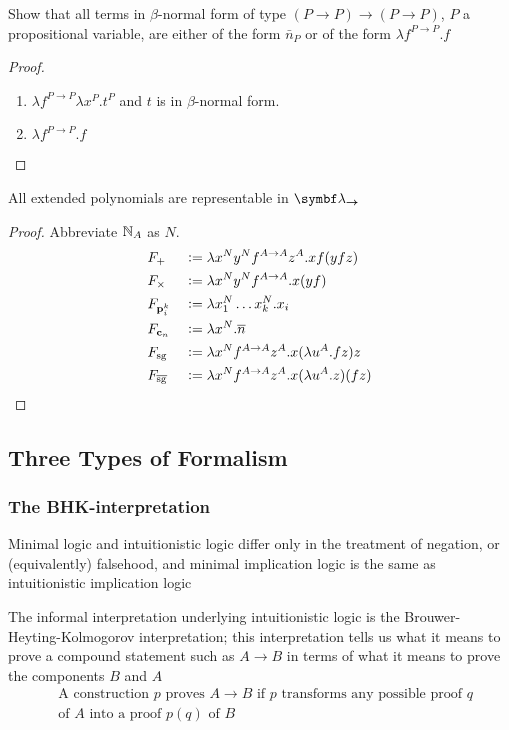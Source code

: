 \documentclass[11pt]{article}
\begin{document}
\begin{exercise}
Show that all terms in \(\beta\)-normal form of type \((P\to P)\to(P\to P)\), \(P\) a
propositional variable, are either of the form \(\bar{n}_P\) or of the form
\(\lambda f^{P\to P}.f\)
\end{exercise}
\begin{proof}
\begin{enumerate}
\item \(\lambda f^{P\to P}\lambda x^P.t^P\) and \(t\) is in \(\beta\)-normal form.
\item \(\lambda f^{P\to P}.f\)
\end{enumerate}
\end{proof}

\begin{theorem}[]
All extended polynomials are representable in \(\blambda_{\bto}\)
\end{theorem}
\begin{proof}
Abbreviate \(\mathbb{N}_A\) as \(N\).
\begin{alignat*}{2}
&F_+&&:=\lambda x^Ny^Nf^{A\to A}z^A.xf(yfz)\\
&F_\times&&:=\lambda x^Ny^Nf^{A\to A}.x(yf)\\
&F_{\operatorname{\textbf{p}}_i^k}&&:=\lambda x_1^N\dots x_k^N.x_i\\
&F_{\operatorname{\textbf{c}}_n}&&:=\lambda x^N.\overline{n}\\
&F_{\operatorname{sg}}&&:=\lambda x^Nf^{A\to A}z^A.x(\lambda u^A.fz)z\\
&F_{\overline{\operatorname{sg}}}&&:=\lambda x^Nf^{A\to A}z^A.x(\lambda u^A.z)(fz)
\end{alignat*}
\end{proof}

\subsection{Three Types of Formalism}
\label{sec:orga6a27a6}
\subsubsection{The BHK-interpretation}
\label{sec:org715bb22}
Minimal logic and intuitionistic logic differ only in the treatment of
negation, or (equivalently) falsehood, and minimal implication logic is the
same  
as intuitionistic implication logic

The informal interpretation underlying intuitionistic logic is the
Brouwer-Heyting-Kolmogorov interpretation; this interpretation tells us what
it means to 
prove a compound statement such as \(A\to B\) in terms of what it means to
prove the components \(B\) and \(A\) 
\begin{align*}
&\text{A construction }p\text{ proves }A\to B\text{ if }p\text{ transforms any
possible proof }q\\
&\text{of }A\text{ into a proof }p(q)\text{ of }B
\end{align*}
\end{document}
